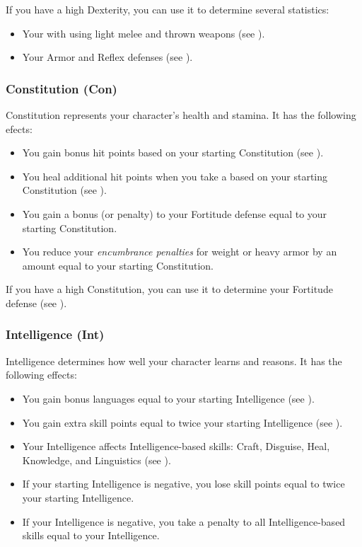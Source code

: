             If you have a high Dexterity, you can use it to determine several statistics:
            \begin{itemize}
                \item Your  with  using light melee and thrown weapons (see ).
                \item Your Armor and Reflex defenses (see ).
            \end{itemize}

        \subsubsection{Constitution (Con)}\label{Constitution}
            Constitution represents your character's health and stamina.
            It has the following efects:
            \begin{itemize}
                \item You gain bonus hit points based on your starting Constitution (see ).
                \item You heal additional hit points when you take a  based on your starting Constitution (see ).
                \item You gain a bonus (or penalty) to your Fortitude defense equal to your starting Constitution.
                \item You reduce your \textit{encumbrance penalties} for weight or heavy armor by an amount equal to your starting Constitution.
            \end{itemize}

            If you have a high Constitution, you can use it to determine your Fortitude defense (see ).

        \subsubsection{Intelligence (Int)}\label{Intelligence}
            Intelligence determines how well your character learns and reasons.
            It has the following effects:

            \begin{itemize}
                \item You gain bonus languages equal to your starting Intelligence (see ).
                \item You gain extra skill points equal to twice your starting Intelligence (see ).
                \item Your Intelligence affects Intelligence-based skills: Craft, Disguise, Heal, Knowledge, and Linguistics (see ).
                \item If your starting Intelligence is negative, you lose skill points equal to twice your starting Intelligence.
                \item If your Intelligence is negative, you take a penalty to all Intelligence-based skills equal to your Intelligence.
            \end{itemize}

